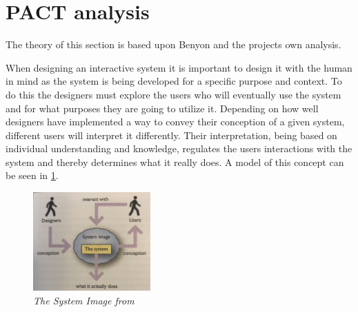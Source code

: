 
\section{PACT analysis}\label{sec:PACT}
The theory of this section is based upon Benyon \cite{Benyon} and the projects own analysis.

When designing an interactive system it is important to design it with the human in mind as the system is being developed for a specific purpose and context.
To do this the designers must explore the users who will eventually use the system and for what purposes they are going to utilize it.
Depending on how well designers have implemented a way to convey their conception of a given system, different users will interpret it differently.
Their interpretation, being based on individual understanding and knowledge, regulates the users interactions with the system and thereby determines what it really does.
A model of this concept can be seen in \cref{fig:PACT-SystemImage}.

\begin{figure}[H]
	\centering
	\includegraphics[width=0.4\textwidth]{billeder/SystemImage-Benyon.png}
	\caption{\textit{The System Image from \citep[p.~31]{Benyon}}}
	\label{fig:PACT-SystemImage}
\end{figure}

